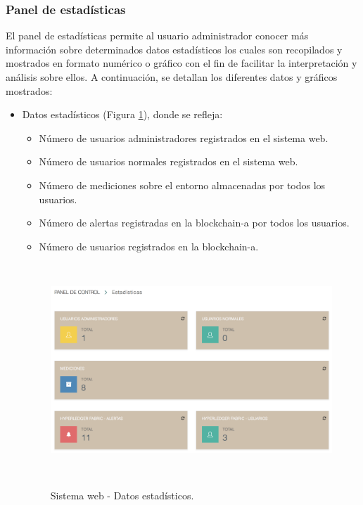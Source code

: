 \documentclass[12pt,a4paper, twoside]{report}
\begin{document}
	\subsubsection{Panel de estadísticas}
	
	El panel de estadísticas permite al usuario administrador conocer más información sobre determinados datos estadísticos los cuales son recopilados y mostrados en formato numérico o gráfico con el fin de facilitar la interpretación y análisis sobre ellos. A continuación, se detallan los diferentes datos y gráficos mostrados:
	
	\begin{itemize}
		\item Datos estadísticos (Figura \ref{fig:web_DatosEstadisticos}), donde se refleja:
		\begin{itemize}
			\item Número de usuarios administradores registrados en el sistema web.
			\item Número de usuarios normales registrados en el sistema web.
			\item Número de mediciones sobre el entorno almacenadas por todos los usuarios.
			\item Número de alertas registradas en la \gls{blockchain-a} por todos los usuarios.
			\item Número de usuarios registrados en la \gls{blockchain-a}.
		\end{itemize}
		
		\begin{figure}[!ht]   
			\caption{Sistema web - Datos estadísticos.} 
			\begin{center}
		 		\includegraphics[width=13cm, height=8cm]{Images/userGuide/web/esDatosEstadisticos} \\
				\label{fig:web_DatosEstadisticos} 
			\end{center}  	
		\end{figure}
		

\end{itemize}
\end{document}
